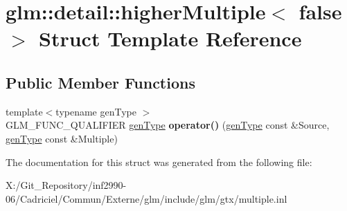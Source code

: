 \hypertarget{structglm_1_1detail_1_1higher_multiple_3_01false_01_4}{\section{glm\-:\-:detail\-:\-:higher\-Multiple$<$ false $>$ Struct Template Reference}
\label{structglm_1_1detail_1_1higher_multiple_3_01false_01_4}
}
\subsection*{Public Member Functions}
\begin{DoxyCompactItemize}
\item 
\hypertarget{structglm_1_1detail_1_1higher_multiple_3_01false_01_4_ae121db4aac2a541989b912b3966bffdb}{{\footnotesize template$<$typename gen\-Type $>$ }\\G\-L\-M\-\_\-\-F\-U\-N\-C\-\_\-\-Q\-U\-A\-L\-I\-F\-I\-E\-R \hyperlink{structglm_1_1detail_1_1gen_type}{gen\-Type} {\bfseries operator()} (\hyperlink{structglm_1_1detail_1_1gen_type}{gen\-Type} const \&Source, \hyperlink{structglm_1_1detail_1_1gen_type}{gen\-Type} const \&Multiple)}\label{structglm_1_1detail_1_1higher_multiple_3_01false_01_4_ae121db4aac2a541989b912b3966bffdb}

\end{DoxyCompactItemize}


The documentation for this struct was generated from the following file\-:\begin{DoxyCompactItemize}
\item 
X\-:/\-Git\-\_\-\-Repository/inf2990-\/06/\-Cadriciel/\-Commun/\-Externe/glm/include/glm/gtx/multiple.\-inl\end{DoxyCompactItemize}
